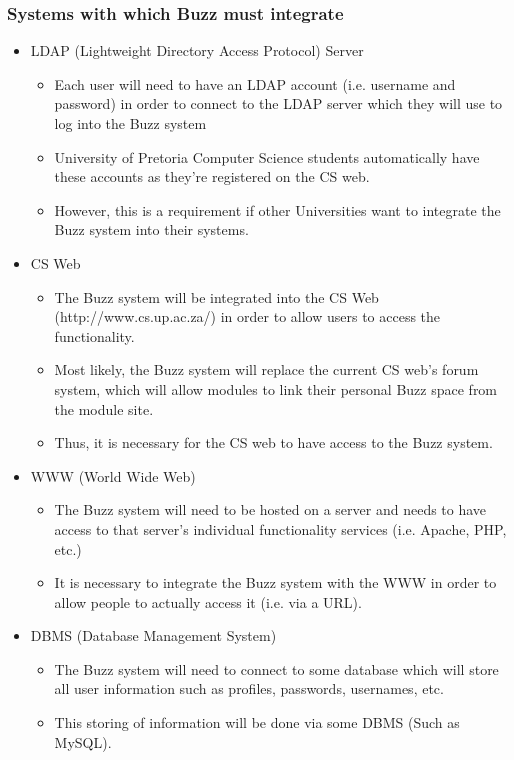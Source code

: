 \documentclass[11pt]{article}
\begin{document}
	\subsubsection{Systems with which Buzz must integrate}
	\begin{itemize}
	\item LDAP (Lightweight Directory Access Protocol) Server
		\begin{itemize}
			\item Each user will need to have an LDAP account (i.e. username and password) in order to connect to the LDAP server which they will use to log into the Buzz system
			\item University of Pretoria Computer Science students automatically have these accounts as they’re registered on the CS web.
			\item However, this is a requirement if other Universities want to integrate the Buzz system into their systems.
		\end{itemize}
	
	\item CS Web
		\begin{itemize}
			\item The Buzz system will be integrated into the CS Web (http://www.cs.up.ac.za/) in order to allow users to access the functionality. 
			\item Most likely, the Buzz system will replace the current CS web’s forum system, which will allow modules to link their personal Buzz space from the module site.
			\item Thus, it is necessary for the CS web to have access to the Buzz system.
		\end{itemize}
	\item WWW (World Wide Web)
		\begin{itemize}
			\item The Buzz system will need to be hosted on a server and needs to have access to that server’s individual functionality services (i.e. Apache, PHP, etc.)
			\item It is necessary to integrate the Buzz system with the WWW in order to allow people to actually access it (i.e. via a URL).
		\end{itemize}
	\item DBMS (Database Management System)
		\begin{itemize}
			\item The Buzz system will need to connect to some database which will store all user information such as profiles, passwords, usernames, etc. 
			\item This storing of information will be done via some DBMS (Such as MySQL).
		\end{itemize}
	\end{itemize}
	
\end{document}
